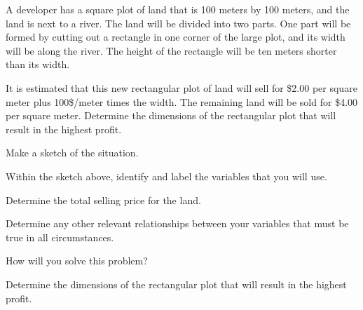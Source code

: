 \begin{problem}
  \clearpage

\item A developer has a square plot of land that is 100 meters by 100
  meters, and the land is next to a river. The land will be divided
  into two parts. One part will be formed by cutting out a rectangle
  in one corner of the large plot, and its width will be along the
  river. The height of the rectangle will be ten meters shorter than
  its width. 

  It is estimated that this new rectangular plot of land will sell for
  \$2.00 per square meter plus 100\$/meter times the width. The
  remaining land will be sold for \$4.00 per square meter.  Determine
  the dimensions of the rectangular plot that will result in the
  highest profit.

    \begin{subproblem}
      \item Make a sketch of the situation.
        \vfill
      \item Within the sketch above, identify and label the variables
        that you will use.
      \item Determine the total selling price for the land.
        
        \vfill

        \clearpage

      \item Determine any other relevant relationships between your
        variables that must be true in all circumstances.
          \vfill
      \item How will you solve this problem?
        \vspace{2em}
      \item Determine the dimensions of the rectangular plot that will
        result in the highest profit.
        \vfill
        \vfill
    \end{subproblem}

\end{problem}

\postClass

